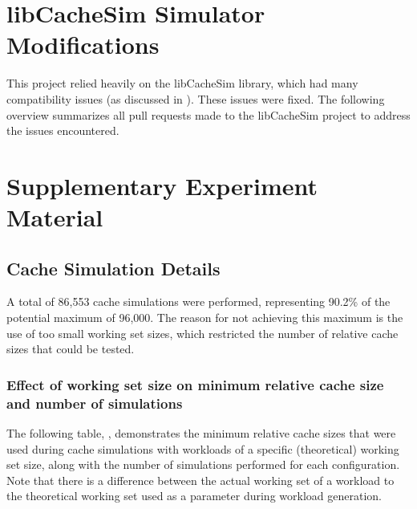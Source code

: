 \appendix

\chapter{libCacheSim Simulator Modifications}\label{PRs}

This project relied heavily on the libCacheSim library, which had many compatibility issues (as discussed in ). These issues were fixed. The following overview summarizes all pull requests made to the libCacheSim project to address the issues encountered.



\chapter{Supplementary Experiment Material}

\section{Cache Simulation Details}

A total of 86,553 cache simulations were performed, representing 90.2\% of the potential maximum of 96,000. The reason for not achieving this maximum is the use of too small working set sizes, which restricted the number of relative cache sizes that could be tested.

\subsection{Effect of working set size on minimum relative cache size and number of simulations}\label{appendix: working-set-size-vs-relative-cache-size}

The following table, , demonstrates the minimum relative cache sizes that were used during cache simulations with workloads of a specific (theoretical) working set size, along with the number of simulations performed for each configuration. Note that there is a difference between the actual working set of a workload to the theoretical working set used as a parameter during workload generation.

